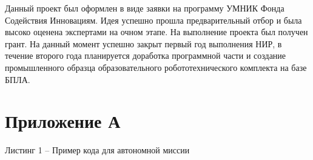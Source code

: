 \documentclass[a4paper,12pt]{article}
\begin{document}
Данный проект был оформлен в виде заявки на программу УМНИК Фонда Содействия Инновациям. Идея успешно прошла предварительный отбор \cite{umnik} и была высоко оценена экспертами на очном этапе. На выполнение проекта был получен грант. На данный момент успешно закрыт первый год выполнения НИР, в течение второго года планируется доработка программной части и создание промышленного образца образовательного робототехнического комплекта на базе БПЛА.
\pagebreak

\printbibliography

\pagebreak
\section*{ \centering Приложение А} 

\begin{center}
	Листинг 1 -- Пример кода для автономной миссии
\end{center}
\end{document}
